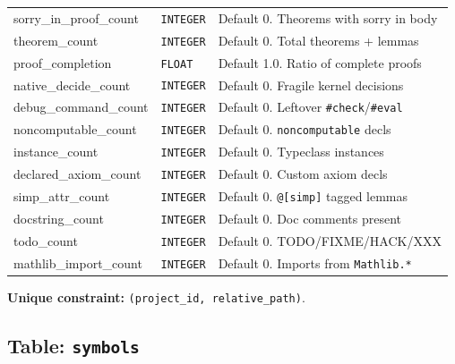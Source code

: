 \begin{longtable}{@{}llp{6cm}@{}}
sorry\_in\_proof\_count & \texttt{INTEGER}           & Default 0. Theorems with sorry in body \\
theorem\_count          & \texttt{INTEGER}           & Default 0. Total theorems + lemmas \\
proof\_completion       & \texttt{FLOAT}             & Default 1.0. Ratio of complete proofs \\
native\_decide\_count   & \texttt{INTEGER}           & Default 0. Fragile kernel decisions \\
debug\_command\_count   & \texttt{INTEGER}           & Default 0. Leftover \texttt{\#check}/\texttt{\#eval} \\
noncomputable\_count    & \texttt{INTEGER}           & Default 0. \texttt{noncomputable} decls \\
instance\_count         & \texttt{INTEGER}           & Default 0. Typeclass instances \\
declared\_axiom\_count  & \texttt{INTEGER}           & Default 0. Custom axiom decls \\
simp\_attr\_count       & \texttt{INTEGER}           & Default 0. \texttt{@[simp]} tagged lemmas \\
docstring\_count        & \texttt{INTEGER}           & Default 0. Doc comments present \\
todo\_count             & \texttt{INTEGER}           & Default 0. TODO/FIXME/HACK/XXX \\
mathlib\_import\_count  & \texttt{INTEGER}           & Default 0. Imports from \texttt{Mathlib.*} \\
\end{longtable}

\noindent\textbf{Unique constraint:} \texttt{(project\_id, relative\_path)}.

\subsection{Table: \texttt{symbols}}

